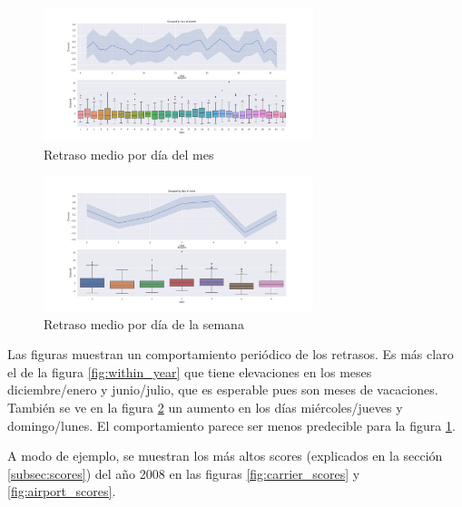 \begin{figure}[hbtp]
  \centering
  \includegraphics[width=0.7\textwidth]{plots/within_month.png}
  \caption{Retraso medio por d\'ia del mes}
  \label{fig:within_month}
\end{figure}

\begin{figure}[hbtp]
  \centering
  \includegraphics[width=0.7\textwidth]{plots/within_week.png}
  \caption{Retraso medio por d\'ia de la semana}
  \label{fig:within_week}
\end{figure}

Las figuras muestran un comportamiento peri\'odico de los retrasos. Es m\'as claro el de la figura \ref{fig:within_year}
que tiene elevaciones en los meses diciembre/enero y junio/julio, que es esperable pues son
meses de vacaciones. Tambi\'en se ve en la figura \ref{fig:within_week} un aumento en los d\'ias mi\'ercoles/jueves
y domingo/lunes. El comportamiento parece ser menos predecible para la figura \ref{fig:within_month}.

A modo de ejemplo, se muestran los m\'as altos scores
(explicados en la secci\'on \ref{subsec:scores}) del a\~no 2008
en las figuras \ref{fig:carrier_scores} y \ref{fig:airport_scores}.

